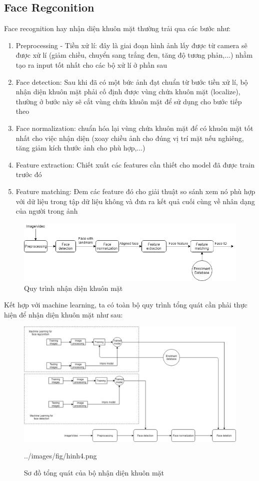 \documentclass[a4paper]{report}
\begin{document}
\subsection{Face Regconition}
Face recognition hay nhận diện khuôn mặt thường trải qua các bước như:
\begin{enumerate}
\item Preprocessing - Tiền xử lí: đây là giai đoạn hình ảnh lấy được từ camera sẽ được xử lí (giảm chiều, chuyển sang trắng đen, tăng độ tương phản,...) nhằm tạo ra input tốt nhất cho các bộ xử lí ở phần sau
\item Face detection: Sau khi đã có một bức ảnh đạt chuẩn từ bước tiền xử lí, bộ nhận diện khuôn mặt phải cố định được vùng chứa khuôn mặt (localize), thường ở bước này sẽ cắt vùng chứa khuôn mặt để sử dụng cho bước tiếp theo
\item Face normalization: chuẩn hóa lại vùng chứa khuôn mặt để có khuôn mặt tốt nhất cho việc nhận diện (xoay chiều ảnh cho đúng vị trí mặt nếu nghiêng, tăng giảm kích thước ảnh cho phù hợp,...)
\item Feature extraction: Chiết xuất các features cần thiết cho model đã được train trước đó
\item Feature matching: Đem các feature đó cho giải thuật so sánh xem nó phù hợp với dữ liệu trong tập dữ liệu không và đưa ra kết quả cuối cùng về nhân dạng của người trong ảnh
\end{enumerate}
\begin{figure}[H]
\includegraphics[width=\textwidth]{../images/fig/hinh3.png}
\caption{Quy trình nhận diện khuôn mặt}
\label{fig:hinh3}
\end{figure}
\noindent
Kết hợp với machine learning, ta có toàn bộ quy trình tổng quát cần phải thực hiện để nhận diện khuôn mặt như sau:
%
\begin{figure}[H]
\includegraphics[width=\textwidth]{../images/fig/hinh4.png}
\caption{Sơ đồ tổng quát của bộ nhận diện khuôn mặt}../images/fig/hinh4.png
\label{fig:hinh4}
\end{figure}
%
\end{document}
